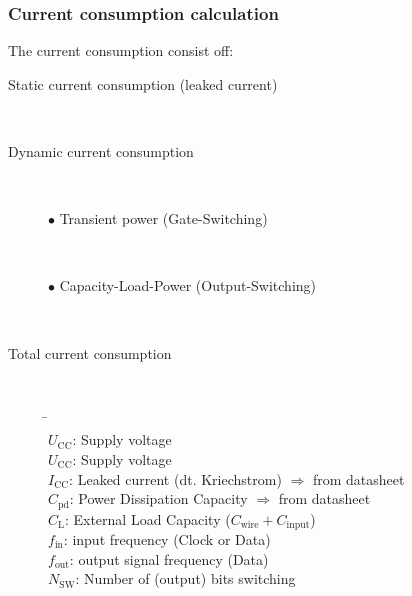 	
\newpage
\subsubsection{Current consumption calculation}
The current consumption consist off:
\begin{description}
	\item[Static current consumption (leaked current)] \hfill \\
		
	\item[Dynamic current consumption] \hfill \\
		\begin{description}
			\item[$\bullet$ Transient power (Gate-Switching)] \hfill \\
				
			\item[$\bullet$ Capacity-Load-Power (Output-Switching)] \hfill \\
		\end{description}	
	\item[Total current consumption] \hfill \\
		\begin{tabbing}
			\hspace{10mm} 			\= \hspace{5mm} \= \\
				$U_{\text{CC}}$: 	\>Supply voltage \\
				$U_{\text{CC}}$: 	\>Supply voltage \\
				$I_{\text{CC}}$: 	\>Leaked current (dt. Kriechstrom) $\Rightarrow$ from datasheet \\
				$C_{\text{pd}}$: 	\>Power Dissipation Capacity $\Rightarrow$ from datasheet  \\
				$C_{\text{L}}$:  	\>External Load Capacity ($C_{\text{wire}} + C_{\text{input}}$)  \\
				$f_{\text{in}}$: 	\>input frequency (Clock or Data)  \\
				$f_{\text{out}}$: 	\>output signal frequency (Data) \\
				$N_{\text{SW}}$:	\> Number of (output) bits switching
		\end{tabbing}
 
\end{description}


